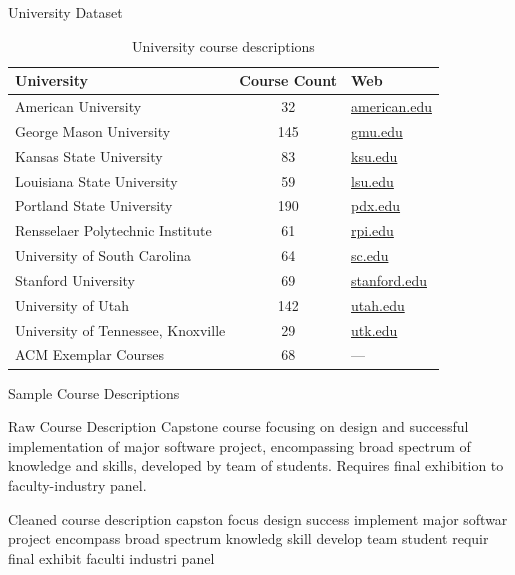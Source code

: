 \documentclass[10pt, compress]{beamer}
\begin{document}
\begin{frame}{University Dataset}
  \begin{table}
    \begin{tabular}{lcl}
      \toprule
      University & Course Count & Web \\
      \midrule
      American University & 32 & \href{http://american.edu}{american.edu} \\
      George Mason University & 145 & \href{http://gmu.edu}{gmu.edu} \\
      Kansas State University & 83 & \href{http://ksu.edu}{ksu.edu} \\
      Louisiana State University & 59 & \href{http://lsu.edu}{lsu.edu} \\
      Portland State University & 190 & \href{http://pdx.edu}{pdx.edu} \\
      Rensselaer Polytechnic Institute & 61 & \href{http://rpi.edu}{rpi.edu} \\
      University of South Carolina & 64 & \href{http://sc.edu}{sc.edu} \\
      Stanford University & 69 & \href{http://stanford.edu}{stanford.edu} \\
      University of Utah & 142 & \href{http://utah.edu}{utah.edu} \\
      University of Tennessee, Knoxville & 29 & \href{http://utk.edu}{utk.edu} \\
      \midrule
      ACM Exemplar Courses & 68 & --- \\
      \bottomrule
    \end{tabular}
    \caption{University course descriptions}
  \end{table}
\end{frame}


\begin{frame}{Sample Course Descriptions}
  \begin{block}{Raw Course Description}
    Capstone course focusing on design and successful implementation of
    major software project, encompassing broad spectrum of knowledge and
    skills, developed by team of students. Requires final exhibition to
    faculty-industry panel.
  \end{block}

  \begin{block}{Cleaned course description}
    capston focus design success implement major softwar project encompass
    broad spectrum knowledg skill develop team student requir final exhibit
    faculti industri panel
  \end{block}
\end{frame}
\end{document}
